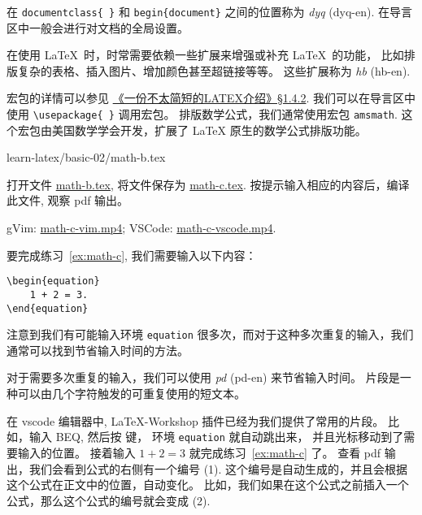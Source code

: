 \documentclass[
    11pt,
    base=hide,
    cite=authoryear,
    device=phone,
    lang=cn,
    mode=simple,
    result=answer,
    toc=onecol,
]{elegantbook_sierxue}
\begin{document}
\begin{latex}\label{tex:preamble}
    在 \lstinline|documentclass{ }| 和
    \lstinline|begin{document}| 之间的位置称为
    \emph{\gls{dyq}} (\gls{dyq-en}).
    在导言区中一般会进行对文档的全局设置。
\end{latex}
\begin{latex}\label{tex:package}
    在使用 \LaTeX\ 时，时常需要依赖一些扩展来增强或补充 \LaTeX\ 的功能，
    比如排版复杂的表格、插入图片、增加颜色甚至超链接等等。
    这些扩展称为
    \emph{\gls{hb}} (\gls{hb-en}).
\end{latex}
宏包的详情可以参见 \hyperlink{books/lshort-zh-cn.pdf.18}%
{《一份不太简短的LATEX介绍》\S1.4.2}.
我们可以在导言区中使用 \lstinline|\usepackage{ }| 调用宏包。
排版数学公式，我们通常使用宏包 \texttt{amsmath}.
这个宏包由美国数学学会开发，扩展了 {\LaTeX} 原生的数学公式排版功能。

%
{learn-latex/basic-02/math-b.tex}
\begin{exercise}\label{ex:math-c}
    打开文件
    \href{learn-latex/basic-02/math-b.tex}{math-b.tex},
    将文件保存为
    \href{learn-latex/basic-02/math-c.tex}{math-c.tex}.
    按提示输入相应的内容后，编译此文件, 观察 pdf 输出。
\end{exercise}
\begin{cast}\label{cast:math-c}
    gVim: \href{media/casts/math-c-vim.mp4}{math-c-vim.mp4};
    VSCode: \href{media/casts/math-c-vscode.mp4}{math-c-vscode.mp4}.
\end{cast}
要完成练习~\ref{ex:math-c}, 我们需要输入以下内容：
\begin{lstlisting}[style=lst]
\begin{equation}
    1 + 2 = 3.
\end{equation}
\end{lstlisting}
注意到我们有可能输入环境 \texttt{equation}
很多次，而对于这种多次重复的输入，我们通常可以找到节省输入时间的方法。
\begin{share}\label{share:snippets}
    对于需要多次重复的输入，我们可以使用
    \emph{\gls{pd}} (\gls{pd-en}) 来节省输入时间。
    片段是一种可以由几个字符触发的可重复使用的短文本。
\end{share}
在 vscode 编辑器中, LaTeX-Workshop 插件已经为我们提供了常用的片段。
比如，输入 BEQ, 然后按  键，
环境 \texttt{equation} 就自动跳出来，
并且光标移动到了需要输入的位置。
接着输入 \(1 + 2 = 3\) 就完成练习~\ref{ex:math-c} 了。
查看 pdf 输出，我们会看到公式的右侧有一个编号 (1).
这个编号是自动生成的，并且会根据这个公式在正文中的位置，自动变化。
比如，我们如果在这个公式之前插入一个公式，那么这个公式的编号就会变成 (2).
\end{document}
